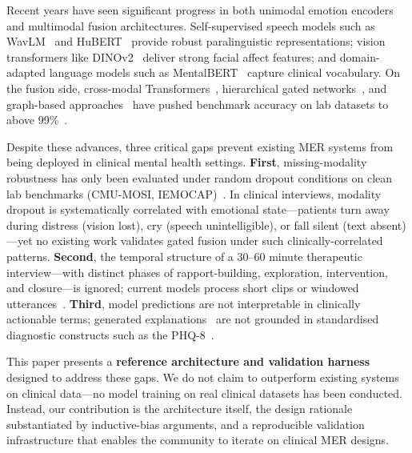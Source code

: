 \documentclass{article}
\begin{document}
Recent years have seen significant progress in both unimodal emotion encoders and
multimodal fusion architectures. Self-supervised speech models such as WavLM~\cite{chen2022wavlm}
and HuBERT~\cite{hsu2021hubert} provide robust paralinguistic representations; vision
transformers like DINOv2~\cite{oquab2023dinov2} deliver strong facial affect features;
and domain-adapted language models such as MentalBERT~\cite{ji2022mentalbert} capture
clinical vocabulary. On the fusion side, cross-modal Transformers~\cite{tsai2019mult},
hierarchical gated networks~\cite{aefnet2025}, and graph-based approaches~\cite{micga2025}
have pushed benchmark accuracy on lab datasets to above 99\%~\cite{unifiedmer2025}.

Despite these advances, three critical gaps prevent existing MER systems from being
deployed in clinical mental health settings. \textbf{First}, missing-modality robustness
has only been evaluated under random dropout conditions on clean lab benchmarks
(CMU-MOSI, IEMOCAP)~\cite{amte2025,micga2025}. In clinical interviews, modality dropout
is systematically correlated with emotional state---patients turn away during distress
(vision lost), cry (speech unintelligible), or fall silent (text absent)---yet no
existing work validates gated fusion under such clinically-correlated patterns.
\textbf{Second}, the temporal structure of a 30--60 minute therapeutic interview---with
distinct phases of rapport-building, exploration, intervention, and closure---is ignored;
current models process short clips or windowed utterances~\cite{dsin2025,dstc2025}.
\textbf{Third}, model predictions are not interpretable in clinically actionable terms;
generated explanations~\cite{ecmc2026} are not grounded in standardised diagnostic
constructs such as the PHQ-8~\cite{kroenke2009phq}.

This paper presents a \textbf{reference architecture and validation harness} designed
to address these gaps. We do not claim to outperform existing systems on clinical
data---no model training on real clinical datasets has been conducted. Instead, our
contribution is the architecture itself, the design rationale substantiated by
inductive-bias arguments, and a reproducible validation infrastructure that enables
the community to iterate on clinical MER designs.
\end{document}
